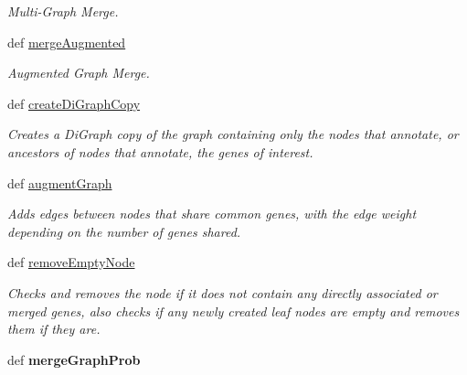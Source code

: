\begin{DoxyCompactItemize}
\begin{DoxyCompactList}\small\item\em Multi-\/\-Graph Merge. \end{DoxyCompactList}\item 
def \hyperlink{classgographer_1_1_g_o_gene_pubmed_graph_1_1_g_o_gene_pubmed_graph_af6522527bb436dfd862d4c60d93c3fa1}{merge\-Augmented}
\begin{DoxyCompactList}\small\item\em Augmented Graph Merge. \end{DoxyCompactList}\item 
def \hyperlink{classgographer_1_1_g_o_gene_pubmed_graph_1_1_g_o_gene_pubmed_graph_a421ce63e7d47fd4c4bd1df3e55b8f180}{create\-Di\-Graph\-Copy}
\begin{DoxyCompactList}\small\item\em Creates a Di\-Graph copy of the graph containing only the nodes that annotate, or ancestors of nodes that annotate, the genes of interest. \end{DoxyCompactList}\item 
def \hyperlink{classgographer_1_1_g_o_gene_pubmed_graph_1_1_g_o_gene_pubmed_graph_a3a4964654724f0a716aa5bd98c45c218}{augment\-Graph}
\begin{DoxyCompactList}\small\item\em Adds edges between nodes that share common genes, with the edge weight depending on the number of genes shared. \end{DoxyCompactList}\item 
def \hyperlink{classgographer_1_1_g_o_gene_pubmed_graph_1_1_g_o_gene_pubmed_graph_a8a4f36c28c64041a147f2847e313f94f}{remove\-Empty\-Node}
\begin{DoxyCompactList}\small\item\em Checks and removes the node if it does not contain any directly associated or merged genes, also checks if any newly created leaf nodes are empty and removes them if they are. \end{DoxyCompactList}\item 
\hypertarget{classgographer_1_1_g_o_gene_pubmed_graph_1_1_g_o_gene_pubmed_graph_a4b48cabd6d6d54ac8c6a2471019e8b6c}{def {\bfseries merge\-Graph\-Prob}}\label{classgographer_1_1_g_o_gene_pubmed_graph_1_1_g_o_gene_pubmed_graph_a4b48cabd6d6d54ac8c6a2471019e8b6c}

\end{DoxyCompactItemize}
